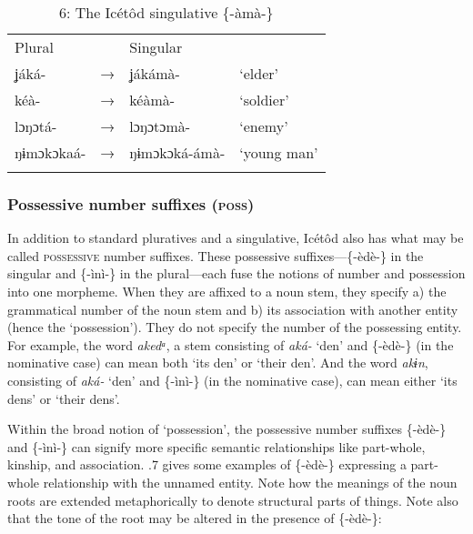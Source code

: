 \begin{table}
\caption{6: The Icétôd singulative \{-àmà-\}}
\label{tab:4}


\begin{tabularx}{\textwidth}{XXXX}
\lsptoprule

Plural &  & Singular & \\
ʝáká- & → & ʝákámà- & ‘elder’\\
kéà- & → & kéàmà- & ‘soldier’\\
lɔŋɔtá- & → & lɔŋɔtɔmà- & ‘enemy’\\
ŋɨmɔkɔkaá- & → & ŋɨmɔkɔká-ámà- & ‘young man’\\
\lspbottomrule
\end{tabularx}
\end{table}

\subsubsection{Possessive number suffixes (\textsc{poss})}

In addition to standard pluratives and a singulative, Icétôd also has what may be called \textsc{possessive} number suffixes. These possessive suffixes—\{-èdè-\} in the singular and \{-ìnì-\} in the plural—each fuse the notions of number and possession into one morpheme. When they are affixed to a noun stem, they specify a) the grammatical number of the noun stem and b) its association with another entity (hence the ‘possession’). They do not specify the number of the possessing entity. For example, the word \textit{akedᵃ}, a stem consisting of \textit{aká- }‘den’ and \{-èdè-\} (in the nominative case) can mean both ‘its den’ or ‘their den’. And the word \textit{akɨn}, consisting of \textit{aká- }‘den’ and \{-ìnì-\} (in the nominative case), can mean either ‘its dens’ or ‘their dens’. 

Within the broad notion of ‘possession’, the possessive number suffixes \{-èdè-\} and \{-ìnì-\} can signify more specific semantic relationships like part-whole, kinship, and association. .7 gives some examples of \{-èdè-\} expressing a part-whole relationship with the unnamed entity. Note how the meanings of the noun roots are extended metaphorically to denote structural parts of things. Note also that the tone of the root may be altered in the presence of \{-èdè-\}:


